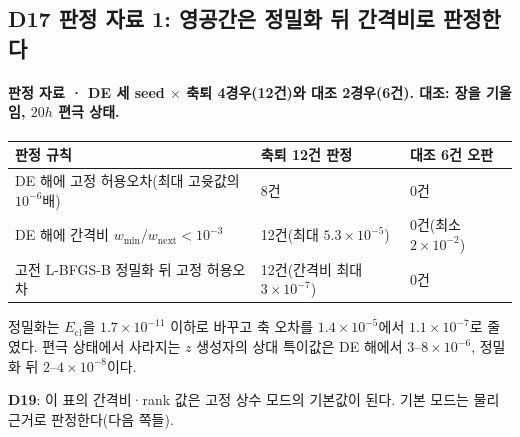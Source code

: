 \subsection{D17 판정 자료 1: 영공간은 정밀화 뒤 간격비로 판정한다}\label{state-selection-null-criteria}
\begingroup%
  \framesubtitle{판정 자료 · DE 세 seed $\times$ 축퇴 4경우(12건)와 대조 2경우(6건). 대조: 장을 기울임, $20h$ 편극 상태.}
  \small
  \begin{tabularx}{\textwidth}{@{}YP{3.0cm}P{3.0cm}@{}}
    \toprule
    판정 규칙 & 축퇴 12건 판정 & 대조 6건 오판 \\
    \midrule
    DE 해에 고정 허용오차(최대 고윳값의 $10^{-6}$배) & 8건 & 0건 \\
    DE 해에 간격비 $w_{\min}/w_{\mathrm{next}}<10^{-3}$ & 12건(최대 $5.3\times10^{-5}$) & 0건(최소 $2\times10^{-2}$) \\
    고전 L-BFGS-B 정밀화 뒤 고정 허용오차 & 12건(간격비 최대 $3\times10^{-7}$) & 0건 \\
    \bottomrule
  \end{tabularx}
  \par\medskip
  정밀화는 $E_{\mathrm{cl}}$을 $1.7\times10^{-11}$ 이하로 바꾸고 축 오차를 $1.4\times10^{-5}$에서 $1.1\times10^{-7}$로 줄였다.
  편극 상태에서 사라지는 $z$ 생성자의 상대 특이값은 DE 해에서 $3$--$8\times10^{-6}$, 정밀화 뒤 $2$--$4\times10^{-8}$이다.
  \par\medskip
  \textbf{D19}: 이 표의 간격비·rank 값은 고정 상수 모드의 기본값이 된다. 기본 모드는 물리 근거로 판정한다(다음 쪽들).
  \par\medskip
\endgroup


